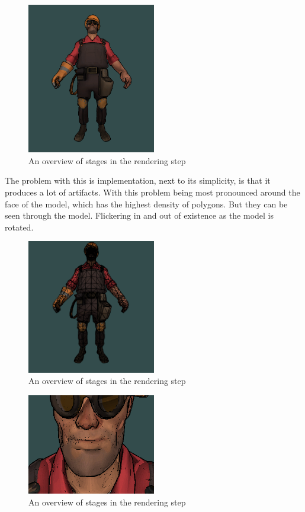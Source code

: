 \begin{figure}[h]
    \centering
    \includegraphics[width=0.5\textwidth]{img/ModelB.png}
    \caption{An overview of stages in the rendering step}
    \label{fig-render-overview}
\end{figure}

The problem with this is implementation, next to its simplicity, is that it produces a lot of artifacts. With this problem being most pronounced around the face of the model, which has the highest density of polygons. But they can be seen through the model. Flickering in and out of existence as the model is rotated.

\begin{figure}[h]
    \centering
    \includegraphics[width=0.5\textwidth]{img/ModelA.png}
    \caption{An overview of stages in the rendering step}
    \label{fig-render-overview}
\end{figure}

\begin{figure}[h]
    \centering
    \includegraphics[width=0.5\textwidth]{img/ModelC.png}
    \caption{An overview of stages in the rendering step}
    \label{fig-render-overview}
\end{figure}

